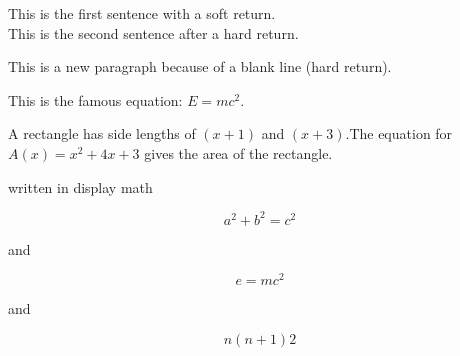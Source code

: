 \documentclass[14pt]{article}
\begin{document}
This is the first sentence with a soft return.\\
This is the second sentence after a hard return.

This is a new paragraph because of a blank line (hard return).

This is the famous equation: $E = mc^2$. 

A rectangle has side lengths of $(x+1)$ and $(x+3)$.The equation for ${A(x)=x^2+4x+3}$ gives the area of the rectangle.

written in display math

\[
a^2 + b^2 = c^2
\]

and

\begin{equation}
e=mc^2
\end{equation}

and 

$$
{n(n+1)}{2}
$$
\end{document}
